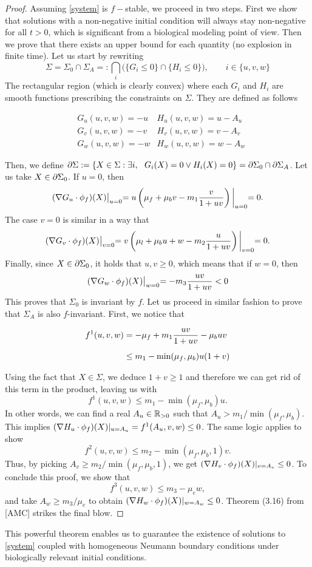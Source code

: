 \begin{proof}
	Assuming \ref{system} is $f-$stable, we proceed in two steps. First we show that solutions with a non-negative initial condition will always stay non-negative for all $t>0$, which is significant from a  biological modeling point of view. Then we prove that there exists an upper bound for each quantity (no explosion in finite time). Let us start by rewriting $$\Sigma = \Sigma_0 \cap \Sigma_A =: \bigcap_i \biggl( \{G_i \le 0\} \cap \{H_i \le 0\}\biggr), \qquad i \in \{u, v, w\}$$
	The rectangular region (which is clearly convex) where each $G_i$ and $H_i$ are smooth functions prescribing the constraints on $\Sigma$. They are defined as follows
	
	\begin{align*}
		& G_u(u, v, w) = -u & H_u(u, v, w) = u - A_u \\[1em]
		& G_v(u, v, w) = -v & H_v(u, v, w) = v - A_v \\[1em]
		& G_w(u, v, w) = -w & H_w(u, v, w) = w - A_w
	\end{align*}

	Then, we define $\partial\Sigma := \{X \in \Sigma : \exists i, \ \  G_i(X) = 0 \lor H_i(X) = 0 \} = \partial \Sigma_0 \cap \partial \Sigma_A$. Let us take $X \in \partial \Sigma_0$. If $u=0$, then $$(\nabla G_u \cdot \phi_f)(X)\bigl\vert_{u=0} = u \left( \mu_f  + \mu_b v - m_1 \dfrac{v}{1 + uv}\right)\biggl\vert_{u=0} = 0.$$ The case $v= 0$ is similar in a way that
	$$(\nabla G_v \cdot \phi_f)(X)\bigl\vert_{v=0} = v \left( \mu_l  + \mu_b u + w - m_2 \dfrac{u}{1 + uv}\right)\biggl\vert_{v=0} = 0.$$ Finally, since $X \in \partial\Sigma_0$, it holds that $u, v \ge 0$, which means that if $w=0$, then $$(\nabla G_w \cdot \phi_f)(X)\bigl\vert_{w=0} = -m_3 \dfrac{uv}{1 + uv} < 0$$ This proves that $\Sigma_0$ is invariant by $f$. Let us proceed in similar fashion to prove that $\Sigma_A$ is also $f$-invariant. First, we notice that
	
	\begin{align}
		f^1(u, v, w) &= -\mu_f + m_1 \dfrac{uv}{1 + uv} - \mu_b uv \notag \\[0.5em]
		& \le m_1 - \min(\mu_f, \mu_b) u (1 + v) \notag
	\end{align}
	
	Using the fact that $X \in \Sigma$, we deduce $1 + v \ge 1$ and therefore we can get rid of this term in the product, leaving us with 
	$$f^1(u, v, w) \le m_1 - \min(\mu_f, \mu_b) u.$$
	In other words, we can find a real $A_u \in \mathbb{R}_{>0}$ such that $A_u > m_1 / \min(\mu_f, \mu_b)$. This implies $(\nabla H_u \cdot \phi_f)(X)\vert_{u=A_u} = f^1(A_u, v, w) \le 0$. The same logic applies to show $$f^2(u, v, w) \le m_2 - \min(\mu_f, \mu_b, 1) v.$$ Thus, by picking $A_v \ge m_2 / \min(\mu_f, \mu_b, 1)$, we get $(\nabla H_v \cdot \phi_f)(X)\vert_{v=A_v} \le 0$. To conclude this proof, we show that $$f^3(u, v, w) \le m_3 - \mu_e w,$$ and take $A_w \ge m_3 / \mu_e$ to obtain $(\nabla H_w \cdot \phi_f)(X)\vert_{w=A_w} \le 0$. Theorem (3.16) from [AMC] strikes the final blow.	
\end{proof}

This powerful theorem enables us to guarantee the existence of solutions to \ref{system} coupled with homogeneous Neumann boundary conditions under biologically relevant initial conditions. 


